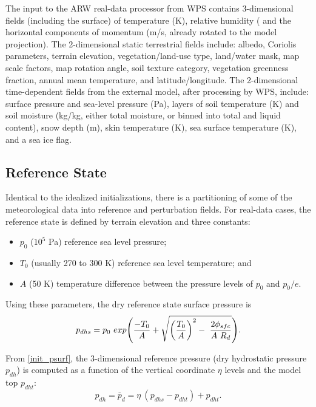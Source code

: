 The input to the ARW real-data processor from 
WPS contains 3-dimensional fields (including
the surface) of temperature (K), relative humidity
(%
and the horizontal components of momentum (m/s, already rotated to the model 
projection).  
The 2-dimensional static terrestrial fields include:
albedo, Coriolis parameters, terrain elevation, vegetation/land-use type, 
land/water mask, map scale factors, map rotation angle, soil texture category, vegetation greenness fraction, 
annual mean temperature, 
and latitude/longitude.  
The 2-dimensional time-dependent fields from the external model, after processing by WPS, include: 
surface pressure and sea-level pressure (Pa), layers of soil temperature (K) and  soil moisture (kg/kg, 
either total moisture, or 
binned into total and liquid content), 
snow depth (m), skin temperature (K), sea surface temperature (K), and a sea ice flag.  

\subsection{Reference State}
\label{initialization_real_base_section}
Identical to the idealized initializations, there is a partitioning of some of the 
meteorological data into reference and perturbation fields.
For real-data cases, the reference state is defined by terrain elevation and three constants:
\begin{itemize}\setlength{\parskip}{-5pt}
\item $p_{0}$ ($10^5$ Pa) reference sea level pressure; 
\item $T_{0}$ (usually 270 to 300 K) reference sea level temperature; and
\item $A$ (50 K) temperature difference between the pressure levels of $p_{0}$ and $p_{0}/e$.
\end{itemize}

\noindent Using these parameters, the dry reference state surface pressure is
\begin{equation}
p_{dhs} = p_{0}~exp\Bigg({-T_{0} \over A} + 
                     \sqrt{ {\bigg( {T_{0} \over A } \bigg)}^2 - ~
                            { 2\phi_{sfc} \over { A~R_d}} } \Bigg).
\label{init_psurf}
\end{equation}

\noindent From \eqref{init_psurf}, the 3-dimensional reference pressure (dry hydrostatic pressure $p_{dh}$)
is computed as
a function of the vertical coordinate $\eta$ levels and the model top $p_{dht}$:
\begin{equation}
p_{dh} = \overline{p}_d = \eta ~( p_{dhs} - p_{dht} ) + p_{dht}.
\label{init_pbar}
\end{equation}

